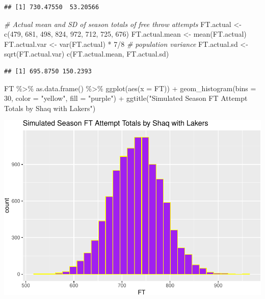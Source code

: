 \documentclass[
  11pt,
]{book}
\newenvironment{Shaded}{\begin{snugshade}}{\end{snugshade}}
\newcommand{\AttributeTok}[1]{\textcolor[rgb]{0.77,0.63,0.00}{#1}}
\newcommand{\CommentTok}[1]{\textcolor[rgb]{0.56,0.35,0.01}{\textit{#1}}}
\newcommand{\DecValTok}[1]{\textcolor[rgb]{0.00,0.00,0.81}{#1}}
\newcommand{\FunctionTok}[1]{\textcolor[rgb]{0.00,0.00,0.00}{#1}}
\newcommand{\NormalTok}[1]{#1}
\newcommand{\OtherTok}[1]{\textcolor[rgb]{0.56,0.35,0.01}{#1}}
\newcommand{\SpecialCharTok}[1]{\textcolor[rgb]{0.00,0.00,0.00}{#1}}
\newcommand{\StringTok}[1]{\textcolor[rgb]{0.31,0.60,0.02}{#1}}
\theoremstyle{definition}
\theoremstyle{definition}
\theoremstyle{definition}
\theoremstyle{definition}
\theoremstyle{remark}
\begin{document}
\begin{verbatim}
## [1] 730.47550  53.20566
\end{verbatim}

\begin{Shaded}
\begin{Highlighting}[]
\CommentTok{\# Actual mean and SD of season totals of free throw attempts}
\NormalTok{FT.actual }\OtherTok{\textless{}{-}} \FunctionTok{c}\NormalTok{(}\DecValTok{479}\NormalTok{, }\DecValTok{681}\NormalTok{, }\DecValTok{498}\NormalTok{, }\DecValTok{824}\NormalTok{, }\DecValTok{972}\NormalTok{, }\DecValTok{712}\NormalTok{, }\DecValTok{725}\NormalTok{, }\DecValTok{676}\NormalTok{)}
\NormalTok{FT.actual.mean }\OtherTok{\textless{}{-}} \FunctionTok{mean}\NormalTok{(FT.actual)}
\NormalTok{FT.actual.var }\OtherTok{\textless{}{-}} \FunctionTok{var}\NormalTok{(FT.actual) }\SpecialCharTok{*} \DecValTok{7}\SpecialCharTok{/}\DecValTok{8}  \CommentTok{\# population variance}
\NormalTok{FT.actual.sd }\OtherTok{\textless{}{-}} \FunctionTok{sqrt}\NormalTok{(FT.actual.var)}
\FunctionTok{c}\NormalTok{(FT.actual.mean, FT.actual.sd)}
\end{Highlighting}
\end{Shaded}

\begin{verbatim}
## [1] 695.8750 150.2393
\end{verbatim}

\begin{Shaded}
\begin{Highlighting}[]
\NormalTok{FT }\SpecialCharTok{\%\textgreater{}\%}
    \FunctionTok{as.data.frame}\NormalTok{() }\SpecialCharTok{\%\textgreater{}\%}
    \FunctionTok{ggplot}\NormalTok{(}\FunctionTok{aes}\NormalTok{(}\AttributeTok{x =}\NormalTok{ FT)) }\SpecialCharTok{+} \FunctionTok{geom\_histogram}\NormalTok{(}\AttributeTok{bins =} \DecValTok{30}\NormalTok{, }\AttributeTok{color =} \StringTok{"yellow"}\NormalTok{, }\AttributeTok{fill =} \StringTok{"purple"}\NormalTok{) }\SpecialCharTok{+}
    \FunctionTok{ggtitle}\NormalTok{(}\StringTok{"Simulated Season FT Attempt Totals by Shaq with Lakers"}\NormalTok{)}
\end{Highlighting}
\end{Shaded}

\includegraphics{series_files/figure-latex/unnamed-chunk-73-1.pdf}
\end{document}
